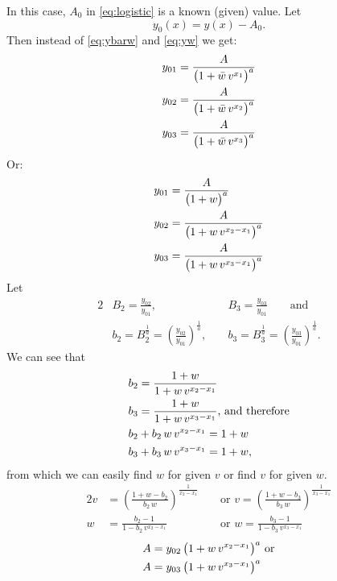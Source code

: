 \documentclass[12pt]{article}
\theoremstyle{remark}
\begin{document}
In this case, $A_0$ in \eqref{eq:logistic} is a known (given)
value. Let
\begin{equation}
  y_0(x) = y(x) - A_0.
\end{equation}
Then instead of \eqref{eq:ybarw} and
\eqref{eq:yw} we get:
\begin{align}
  y_{01} &= \frac{A}{\big(1 + \bar{w} \, v^{x_1} \big)^a} \notag \\
  y_{02} &= \frac{A}{\big(1 + \bar{w} \, v^{x_2} \big)^a} \notag \\
  y_{03} &= \frac{A}{\big(1 + \bar{w} \, v^{x_3} \big)^a} 
\end{align}
Or:
\begin{align}
  y_{01} &= \frac{A}{\big(1 + w\big)^a} \notag \\
  y_{02} &= \frac{A}{\big(1 + w \, v^{x_2 - x_1} \big)^a} \notag \\
  y_{03} &= \frac{A}{\big(1 + w \, v^{x_3 - x_1} \big)^a} 
\end{align}
Let
\begin{alignat}{2} \label{eq:B}
  &B_2 = \frac{y_{02}}{y_{01}}, && B_3 = \frac{y_{03}}{y_{01}}
  \qquad \text{and} \\
  &b_2 = B_2^{\frac{1}{a}} = \left( \frac{y_{02}}{y_{01}}
  \right)^{\frac{1}{a}}, \; &&
  b_3 = B_3^{\frac{1}{a}} = \left( \frac{y_{03}}{y_{01}}
  \right)^{\frac{1}{a}}.
\end{alignat}
We can see that
\begin{align} \label{eq:bw}
  &b_2 = \frac{1 + w}{1 + w \, v^{x_2 - x_1}} \notag \\
  &b_3 = \frac{1 + w}{1 + w \, v^{x_3 - x_1}} \text{, and therefore} \\
  &b_2 + b_2 \, w \, v^{x_2 - x_1} = 1 + w \notag \\
  &b_3 + b_3 \, w \, v^{x_3 - x_1} = 1 + w, 
\end{align}
from which we can easily find $w$ for given $v$ or find $v$ for given
$w$.
\begin{alignat}{2}
  v &= \left(\frac{1 + w - b_2}{b_2 \, w}\right)^{\frac{1}{x_2 - x_1}}
  && \text{ or }
  v   = \left(\frac{1 + w - b_3}{b_3 \, w}\right)^{\frac{1}{x_3 - x_1}}
  \\
  w &= \frac{b_2 - 1}{1 - b_2 \, v^{x_2 - x_1}} && \text{ or }
  w   = \frac{b_3 - 1}{1 - b_3 \, v^{x_3 - x_1}}  
\end{alignat}
\begin{align}
  A &= y_{02} \, \big(1 + w \, v^{x_2 - x_1}\big)^a \text{ or} \notag \\
  A &= y_{03} \, \big(1 + w \, v^{x_3 - x_1}\big)^a
\end{align}
\end{document}
